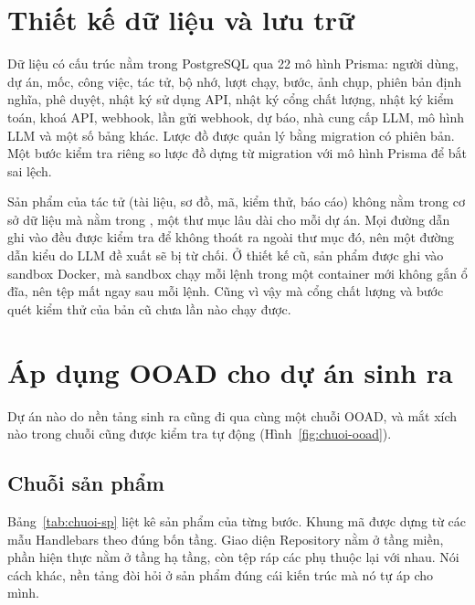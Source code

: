 \section{Thiết kế dữ liệu và lưu trữ}

Dữ liệu có cấu trúc nằm trong PostgreSQL qua 22 mô hình Prisma: người dùng, dự án, mốc, công việc, tác tử, bộ nhớ, lượt chạy, bước, ảnh chụp, phiên bản định nghĩa, phê duyệt, nhật ký sử dụng API, nhật ký cổng chất lượng, nhật ký kiểm toán, khoá API, webhook, lần gửi webhook, dự báo, nhà cung cấp LLM, mô hình LLM và một số bảng khác. Lược đồ được quản lý bằng migration có phiên bản. Một bước kiểm tra riêng so lược đồ dựng từ migration với mô hình Prisma để bắt sai lệch.

Sản phẩm của tác tử (tài liệu, sơ đồ, mã, kiểm thử, báo cáo) không nằm trong cơ sở dữ liệu mà nằm trong , một thư mục lâu dài cho mỗi dự án. Mọi đường dẫn ghi vào đều được kiểm tra để không thoát ra ngoài thư mục đó, nên một đường dẫn kiểu  do LLM đề xuất sẽ bị từ chối. Ở thiết kế cũ, sản phẩm được ghi vào sandbox Docker, mà sandbox chạy mỗi lệnh trong một container mới không gắn ổ đĩa, nên tệp mất ngay sau mỗi lệnh. Cũng vì vậy mà cổng chất lượng và bước quét kiểm thử của bản cũ chưa lần nào chạy được.

\section{Áp dụng OOAD cho dự án sinh ra}
\label{sec:ooad-du-an}

Dự án nào do nền tảng sinh ra cũng đi qua cùng một chuỗi OOAD, và mắt xích nào trong chuỗi cũng được kiểm tra tự động (Hình~\ref{fig:chuoi-ooad}).

\subsection{Chuỗi sản phẩm}

Bảng~\ref{tab:chuoi-sp} liệt kê sản phẩm của từng bước. Khung mã được dựng từ các mẫu Handlebars theo đúng bốn tầng. Giao diện Repository nằm ở tầng miền, phần hiện thực nằm ở tầng hạ tầng, còn tệp  ráp các phụ thuộc lại với nhau. Nói cách khác, nền tảng đòi hỏi ở sản phẩm đúng cái kiến trúc mà nó tự áp cho mình.

